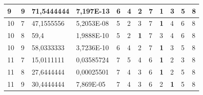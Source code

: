\documentclass[conference]{IEEEtran}
\begin{document}
\begin{table}[]
\begin{tabular}{|llll|llllllll|}
		\multicolumn{1}{|l|}{9}   & \multicolumn{1}{l|}{9}         & \multicolumn{1}{l|}{71,5444444}    & 7,197E-13  & \multicolumn{1}{l|}{6}   & \multicolumn{1}{l|}{4}          & \multicolumn{1}{l|}{2}          & \multicolumn{1}{l|}{7}          & \multicolumn{1}{l|}{\textbf{1}} & \multicolumn{1}{l|}{3}          & \multicolumn{1}{l|}{5}   & 8                      \\ \hline
		\multicolumn{1}{|l|}{10}  & \multicolumn{1}{l|}{7}         & \multicolumn{1}{l|}{47,1555556}    & 5,2053E-08 & \multicolumn{1}{l|}{5}   & \multicolumn{1}{l|}{2}          & \multicolumn{1}{l|}{3}          & \multicolumn{1}{l|}{7}          & \multicolumn{1}{l|}{\textbf{1}} & \multicolumn{1}{l|}{4}          & \multicolumn{1}{l|}{6}   & 8                      \\ \hline
		\multicolumn{1}{|l|}{10}  & \multicolumn{1}{l|}{8}         & \multicolumn{1}{l|}{59,4}          & 1,9888E-10 & \multicolumn{1}{l|}{5}   & \multicolumn{1}{l|}{2}          & \multicolumn{1}{l|}{\textbf{1}} & \multicolumn{1}{l|}{7}          & \multicolumn{1}{l|}{3}          & \multicolumn{1}{l|}{4}          & \multicolumn{1}{l|}{6}   & 8                      \\ \hline
		\multicolumn{1}{|l|}{10}  & \multicolumn{1}{l|}{9}         & \multicolumn{1}{l|}{58,0333333}    & 3,7236E-10 & \multicolumn{1}{l|}{6}   & \multicolumn{1}{l|}{4}          & \multicolumn{1}{l|}{2}          & \multicolumn{1}{l|}{7}          & \multicolumn{1}{l|}{\textbf{1}} & \multicolumn{1}{l|}{3}          & \multicolumn{1}{l|}{5}   & 8                      \\ \hline
		\multicolumn{1}{|l|}{11}  & \multicolumn{1}{l|}{7}         & \multicolumn{1}{l|}{15,0111111}    & 0,03585724 & \multicolumn{1}{l|}{7}   & \multicolumn{1}{l|}{5}          & \multicolumn{1}{l|}{4}          & \multicolumn{1}{l|}{6}          & \multicolumn{1}{l|}{\textbf{1}} & \multicolumn{1}{l|}{2}          & \multicolumn{1}{l|}{3}   & 8                      \\ \hline
		\multicolumn{1}{|l|}{11}  & \multicolumn{1}{l|}{8}         & \multicolumn{1}{l|}{27,6444444}    & 0,00025501 & \multicolumn{1}{l|}{7}   & \multicolumn{1}{l|}{4}          & \multicolumn{1}{l|}{3}          & \multicolumn{1}{l|}{6}          & \multicolumn{1}{l|}{\textbf{1}} & \multicolumn{1}{l|}{2}          & \multicolumn{1}{l|}{5}   & 8                      \\ \hline
		\multicolumn{1}{|l|}{11}  & \multicolumn{1}{l|}{9}         & \multicolumn{1}{l|}{30,4444444}    & 7,869E-05  & \multicolumn{1}{l|}{7}   & \multicolumn{1}{l|}{4}          & \multicolumn{1}{l|}{3}          & \multicolumn{1}{l|}{6}          & \multicolumn{1}{l|}{2}          & \multicolumn{1}{l|}{\textbf{1}} & \multicolumn{1}{l|}{5}   & 8                      \\ \hline

\end{tabular}
\end{table}
\end{document}
